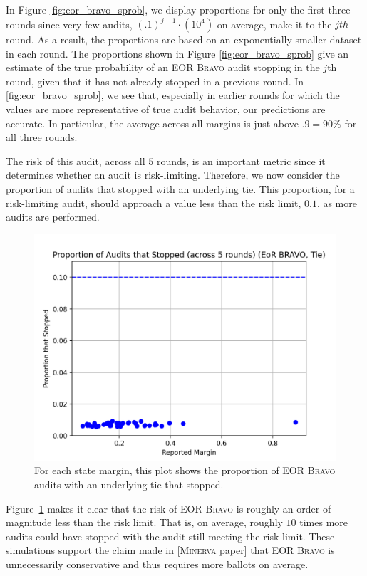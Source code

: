 \documentclass[runningheads]{llncs}
\newcommand{\Minerva}{\textsc{Minerva}\xspace}
\newcommand{\BRAVO}{\textsc{Bravo}\xspace}
\begin{document}
In Figure \ref{fig:eor_bravo_sprob}, we display proportions for only the first three rounds
since very few audits, $(.1)^{j-1}\cdot(10^4)$ on average, 
make it to the $jth$ round.
As  a result, the proportions are based on an exponentially smaller dataset in each round.
The proportions shown in Figure \ref{fig:eor_bravo_sprob} give an estimate
of the true probability of an EOR \BRAVO audit stopping in the $j$th round,
given that it has not already stopped in a previous round. 
In \ref{fig:eor_bravo_sprob}, we see that, especially in earlier rounds for which 
the values are more representative of true audit behavior, 
our predictions are accurate.
In particular, the average across all margins is just above $.9=90\%$ for
all three rounds.

The risk of this audit, across all $5$ rounds, is an important metric since it determines whether an audit is risk-limiting.
Therefore, we now consider the proportion of audits that stopped with an underlying tie.
This proportion, for a risk-limiting audit, should approach a value less than the risk limit, $0.1$, as more audits are performed.

\begin{figure}[H]
\includegraphics[width=\textwidth]{eor_bravo_90perc_10^4_corrected/total_risk.png}
\caption{For each state margin, this plot shows
the proportion of EOR \BRAVO audits with an underlying
tie that stopped.}
\label{fig:eor_bravo_risk}
\end{figure}

Figure~\ref{fig:eor_bravo_risk} makes it clear that the risk of EOR \BRAVO is roughly
an order of magnitude less than the risk limit. 
That is, on average, roughly $10$ times more audits could have stopped 
with the audit still meeting the risk limit.
These simulations support the claim made in [\Minerva paper]
that EOR \BRAVO is unnecessarily conservative and thus requires
more ballots on average.
\end{document}
